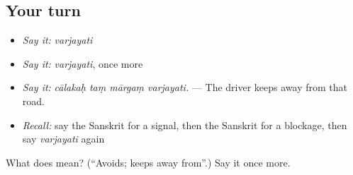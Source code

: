 \subsection*{Your turn}
\begin{itemize}
\raggedright
  \item \emph{Say it:} \emph{varjayati}
  \item \emph{Say it:} \emph{varjayati}, once more
  \item \emph{Say it:} \emph{cālakaḥ taṃ mārgaṃ varjayati.} — The driver keeps away from that road.
  \item \emph{Recall:} say the Sanskrit for a signal, then the Sanskrit for a blockage, then say \emph{varjayati} again
\end{itemize}

\begin{tcolorbox}[breakable,colback=teal!4,colframe=teal!35!black,title={Before you move on}]
What does  mean? (\textquotedblleft{}Avoids; keeps away from\textquotedblright{}.) Say it once more.
\end{tcolorbox}
